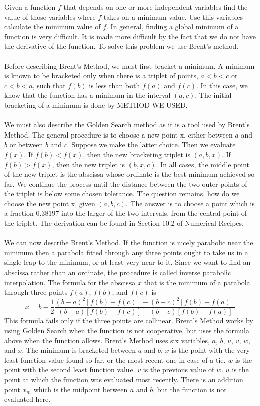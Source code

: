 \documentclass[12pt]{article}
\begin{document}
\begin{flushleft}
\qquad Given a function $f$ that depends on one or more independent variables find the value of those variables where $f$ takes on a minimum value. Use this variables calculate the minimum value of $f$. In general, finding a global minimum of a function is very difficult. It is made more difficult by the fact that we do not have the derivative of the function. To solve this problem we use Brent's method. 
\\~\\
Before describing Brent's Method, we must first bracket a minimum. A minimum is known to be bracketed only when there is a triplet of points, $a<b<c$ or $c<b<a$, such that $f(b)$ is less than both $f(a)$ and $f(c)$. In this case, we know that the function has a minimum in the interval $(a,c)$. The initial bracketing of a minimum is done by METHOD WE USED.
\\~\\
\qquad We must also describe the Golden Search method as it is a tool used by Brent's Method. The general procedure is to choose a new point x, either between $a$ and $b$ or between $b$ and $c$. Suppose we make the latter choice. Then we evaluate $f(x)$. If $f(b)<f(x)$, then the new bracketing triplet is $(a,b,x)$. If $f(b)>f(x)$, then the new triplet is $(b,x,c)$. In all cases, the middle point of the new triplet is the abscissa whose ordinate is the best minimum achieved so far. We continue the process until the distance between the two outer points of the triplet is below some chosen tolerance. The question remains, how do we choose the new point x, given $(a,b,c)$. The answer is to choose a point which is a fraction $0.38197$ into the larger of the two intervals, from the central point of the triplet. The derivation can be found in Section 10.2 of Numerical Recipes.
\\~\\
\qquad We can now describe Brent's Method. If the function is nicely parabolic near the minimum then a parabola fitted through any three points ought to take us in a single leap to the minimum, or at least very near to it. Since we want to find an abscissa rather than an ordinate, the procedure is called inverse parabolic interpolation. The formula for the abscissa $x$ that is the minimum of a parabola through three points $f(a)$, $f(b)$, and $f(c)$ is
$$x = b - \frac{1}{2}\frac{(b-a)^2[f(b)-f(c)]-(b-c)^2[f(b)-f(a)]}{(b-a)[f(b)-f(c)]-(b-c)[f(b)-f(a)]}$$
\qquad This formula fails only if the three points are collinear. Brent's Method works by using Golden Search when the function is not cooperative, but uses the formula above when the function allows. Brent's Method uses six variables, $a$, $b$, $u$, $v$, $w$, and $x$. The minimum is bracketed between $a$ and $b$. $x$ is the point with the very least function value found so far, or the most recent one in case of a tie. $w$ is the point with the second least function value. $v$ is the previous value of $w$. $u$ is the point at which the function was evaluated most recently. There is an addition point $x_m$ which is the midpoint between $a$ and $b$, but the function is not evaluated here. 

\end{flushleft}
\end{document}
